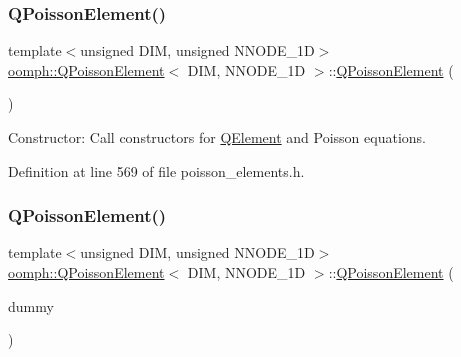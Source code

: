 \subsubsection{\texorpdfstring{Q\+Poisson\+Element()}{QPoissonElement()}\hspace{0.1cm}{\footnotesize\ttfamily [1/2]}}
{\footnotesize\ttfamily template$<$unsigned D\+IM, unsigned N\+N\+O\+D\+E\+\_\+1D$>$ \\
\hyperlink{classoomph_1_1QPoissonElement}{oomph\+::\+Q\+Poisson\+Element}$<$ D\+IM, N\+N\+O\+D\+E\+\_\+1D $>$\+::\hyperlink{classoomph_1_1QPoissonElement}{Q\+Poisson\+Element} (\begin{DoxyParamCaption}{ }\end{DoxyParamCaption})\hspace{0.3cm}{\ttfamily [inline]}}



Constructor\+: Call constructors for \hyperlink{classoomph_1_1QElement}{Q\+Element} and Poisson equations. 



Definition at line 569 of file poisson\+\_\+elements.\+h.

\mbox{\label{classoomph_1_1QPoissonElement_a20de2b0a6228fe3ad7e86d03d95651ad}} 
\subsubsection{\texorpdfstring{Q\+Poisson\+Element()}{QPoissonElement()}\hspace{0.1cm}{\footnotesize\ttfamily [2/2]}}
{\footnotesize\ttfamily template$<$unsigned D\+IM, unsigned N\+N\+O\+D\+E\+\_\+1D$>$ \\
\hyperlink{classoomph_1_1QPoissonElement}{oomph\+::\+Q\+Poisson\+Element}$<$ D\+IM, N\+N\+O\+D\+E\+\_\+1D $>$\+::\hyperlink{classoomph_1_1QPoissonElement}{Q\+Poisson\+Element} (\begin{DoxyParamCaption}\item[{const \hyperlink{classoomph_1_1QPoissonElement}{Q\+Poisson\+Element}$<$ D\+IM, N\+N\+O\+D\+E\+\_\+1D $>$ \&}]{dummy }\end{DoxyParamCaption})\hspace{0.3cm}{\ttfamily [inline]}}



